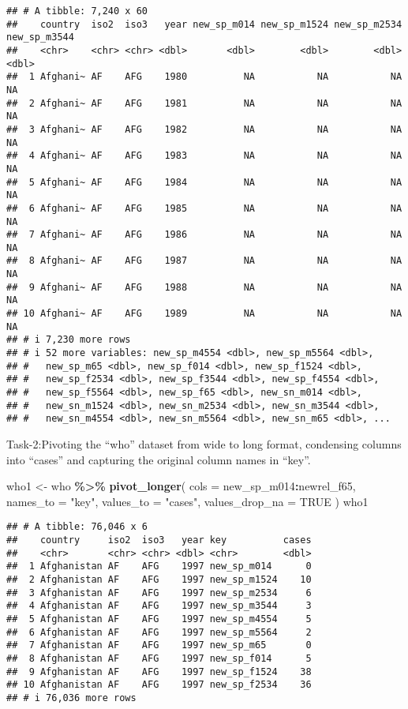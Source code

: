 \documentclass[
]{article}
\newenvironment{Shaded}{\begin{snugshade}}{\end{snugshade}}
\newcommand{\AttributeTok}[1]{\textcolor[rgb]{0.13,0.29,0.53}{#1}}
\newcommand{\ConstantTok}[1]{\textcolor[rgb]{0.56,0.35,0.01}{#1}}
\newcommand{\FunctionTok}[1]{\textcolor[rgb]{0.13,0.29,0.53}{\textbf{#1}}}
\newcommand{\NormalTok}[1]{#1}
\newcommand{\OtherTok}[1]{\textcolor[rgb]{0.56,0.35,0.01}{#1}}
\newcommand{\SpecialCharTok}[1]{\textcolor[rgb]{0.81,0.36,0.00}{\textbf{#1}}}
\newcommand{\StringTok}[1]{\textcolor[rgb]{0.31,0.60,0.02}{#1}}
\begin{document}
\begin{verbatim}
## # A tibble: 7,240 x 60
##    country  iso2  iso3   year new_sp_m014 new_sp_m1524 new_sp_m2534 new_sp_m3544
##    <chr>    <chr> <chr> <dbl>       <dbl>        <dbl>        <dbl>        <dbl>
##  1 Afghani~ AF    AFG    1980          NA           NA           NA           NA
##  2 Afghani~ AF    AFG    1981          NA           NA           NA           NA
##  3 Afghani~ AF    AFG    1982          NA           NA           NA           NA
##  4 Afghani~ AF    AFG    1983          NA           NA           NA           NA
##  5 Afghani~ AF    AFG    1984          NA           NA           NA           NA
##  6 Afghani~ AF    AFG    1985          NA           NA           NA           NA
##  7 Afghani~ AF    AFG    1986          NA           NA           NA           NA
##  8 Afghani~ AF    AFG    1987          NA           NA           NA           NA
##  9 Afghani~ AF    AFG    1988          NA           NA           NA           NA
## 10 Afghani~ AF    AFG    1989          NA           NA           NA           NA
## # i 7,230 more rows
## # i 52 more variables: new_sp_m4554 <dbl>, new_sp_m5564 <dbl>,
## #   new_sp_m65 <dbl>, new_sp_f014 <dbl>, new_sp_f1524 <dbl>,
## #   new_sp_f2534 <dbl>, new_sp_f3544 <dbl>, new_sp_f4554 <dbl>,
## #   new_sp_f5564 <dbl>, new_sp_f65 <dbl>, new_sn_m014 <dbl>,
## #   new_sn_m1524 <dbl>, new_sn_m2534 <dbl>, new_sn_m3544 <dbl>,
## #   new_sn_m4554 <dbl>, new_sn_m5564 <dbl>, new_sn_m65 <dbl>, ...
\end{verbatim}

Task-2:Pivoting the ``who'' dataset from wide to long format, condensing
columns into ``cases'' and capturing the original column names in
``key''.

\begin{Shaded}
\begin{Highlighting}[]
\NormalTok{who1 }\OtherTok{\textless{}{-}}\NormalTok{ who }\SpecialCharTok{\%\textgreater{}\%} 
  \FunctionTok{pivot\_longer}\NormalTok{(}
    \AttributeTok{cols =}\NormalTok{ new\_sp\_m014}\SpecialCharTok{:}\NormalTok{newrel\_f65, }
    \AttributeTok{names\_to =} \StringTok{"key"}\NormalTok{, }
    \AttributeTok{values\_to =} \StringTok{"cases"}\NormalTok{, }
    \AttributeTok{values\_drop\_na =} \ConstantTok{TRUE}
\NormalTok{  )}
\NormalTok{who1}
\end{Highlighting}
\end{Shaded}

\begin{verbatim}
## # A tibble: 76,046 x 6
##    country     iso2  iso3   year key          cases
##    <chr>       <chr> <chr> <dbl> <chr>        <dbl>
##  1 Afghanistan AF    AFG    1997 new_sp_m014      0
##  2 Afghanistan AF    AFG    1997 new_sp_m1524    10
##  3 Afghanistan AF    AFG    1997 new_sp_m2534     6
##  4 Afghanistan AF    AFG    1997 new_sp_m3544     3
##  5 Afghanistan AF    AFG    1997 new_sp_m4554     5
##  6 Afghanistan AF    AFG    1997 new_sp_m5564     2
##  7 Afghanistan AF    AFG    1997 new_sp_m65       0
##  8 Afghanistan AF    AFG    1997 new_sp_f014      5
##  9 Afghanistan AF    AFG    1997 new_sp_f1524    38
## 10 Afghanistan AF    AFG    1997 new_sp_f2534    36
## # i 76,036 more rows
\end{verbatim}
\end{document}
